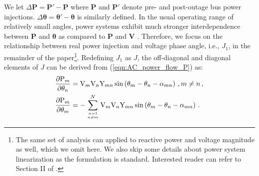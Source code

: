 We let $\Delta \textbf{P} = \textbf{P}' - \textbf{P}$ where $\textbf{P}$ and $\textbf{P}'$ denote pre- and post-outage bus power injections. $\Delta\boldsymbol{\theta} = \boldsymbol{\theta}' - \boldsymbol{\theta}$ is similarly defined. In the usual operating range of relatively small angles, power systems exhibit much stronger interdependence between \textbf{P} and $\boldsymbol{\theta}$ as compared to \textbf{P} and \textbf{V} \cite{murty2017power}. Therefore, we focus on the relationship between real power injection and voltage phase angle, i.e., ${J}_1$, in the remainder of the paper\footnote{The same set of analysis can applied to reactive power and voltage magnitude as well, which we omit here. We also skip some details about power system linearization as the formulation is standard. Interested reader can refer to Section II of \cite{yang2020control}.}. Redefining ${J}_1$ as ${J}$, the off-diagonal and diagonal elements of ${J}$ can be derived from (\ref{eqn:AC_power_flow_P}) as:
\begin{subequations}
\label{eqn:elements_J}
\begin{align}
    \frac{\partial \text{P}_{m}}{\partial \theta_{n}} 
    & = \text{V}_{m} \text{V}_{n} \text{Y}_{m n} \sin \left( \theta_{m} - \theta_{n} - \alpha_{m n} \right) \,,  m \neq n \,,\label{eqn:elements_J_off}\\ 
    \frac{\partial \text{P}_{m}}{\partial \theta_{m}} 
    & = -\sum_{ n=1 \atop n \neq m}^{N} \text{V}_{m} \text{V}_{n} \text{Y}_{m n} \sin \left( \theta_{m} - \theta_{n} - \alpha_{m n} \right) \,. \label{eqn:elements_J_diag} 
\end{align}
\end{subequations}

